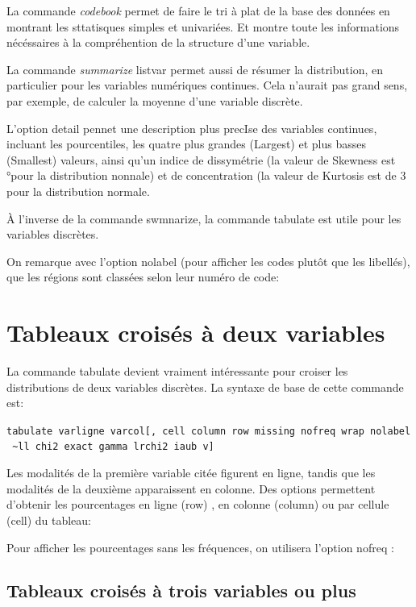 \documentclass[
]{book}
\begin{document}
La commande \emph{codebook} permet de faire le tri à plat de la base des données en montrant les sttatisques simples et univariées. Et montre toute les informations nécéssaires à la compréhention de la structure d'une variable.

La commande \emph{summarize} listvar permet aussi de résumer
la distribution, en particulier pour les variables numériques
continues. Cela n'aurait pas grand sens, par exemple, de calculer
la moyenne d'une variable discrète.

L'option detail pennet une description plus precIse des
variables continues, incluant les pourcentiles, les quatre plus
grandes (Largest) et plus basses (Smallest) valeurs, ainsi
qu'un indice de dissymétrie (la valeur de Skewness est °pour
la distribution nonnale) et de concentration (la valeur de
Kurtosis est de 3 pour la distribution normale.

À l'inverse de la commande swmnarize, la commande tabulate est utile pour les variables discrètes.

On remarque avec l'option nolabel (pour afficher les codes plutôt que les libellés), que les régions sont classées selon leur numéro de code:

\hypertarget{tableaux-croisuxe9s-uxe0-deux-variables}{%
\section{Tableaux croisés à deux variables}\label{tableaux-croisuxe9s-uxe0-deux-variables}}

La commande tabulate devient vraiment intéressante pour croiser les distributions de deux variables discrètes. La syntaxe de base de cette commande est:

\texttt{tabulate\ varligne\ varcol{[},\ cell\ column\ row\ missing\ nofreq\ wrap\ nolabel\ \textasciitilde{}ll\ chi2\ exact\ gamma\ lrchi2\ iaub\ v{]}}

Les modalités de la première variable citée figurent en ligne, tandis que les modalités de la deuxième apparaissent en colonne. Des options permettent d'obtenir les pourcentages en ligne (row) , en colonne (column) ou par cellule (cell) du tableau:

Pour afficher les pourcentages sans les fréquences, on utilisera l'option nofreq :

\hypertarget{tableaux-croisuxe9s-uxe0-trois-variables-ou-plus}{%
\subsection{Tableaux croisés à trois variables ou plus}\label{tableaux-croisuxe9s-uxe0-trois-variables-ou-plus}}
\end{document}
